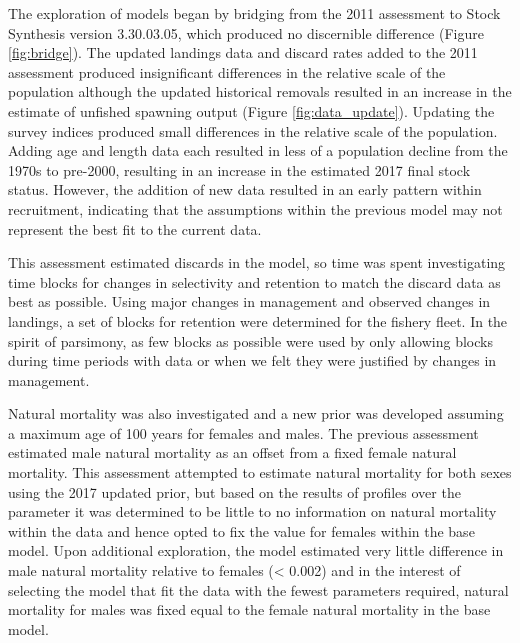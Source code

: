 \documentclass[12pt,]{article}
\begin{document}
The exploration of models began by bridging from the 2011 assessment to
Stock Synthesis version 3.30.03.05, which produced no discernible
difference (Figure \ref{fig:bridge}). The updated landings data and
discard rates added to the 2011 assessment produced insignificant
differences in the relative scale of the population although the updated
historical removals resulted in an increase in the estimate of unfished
spawning output (Figure \ref{fig:data_update}). Updating the survey
indices produced small differences in the relative scale of the
population. Adding age and length data each resulted in less of a
population decline from the 1970s to pre-2000, resulting in an increase
in the estimated 2017 final stock status. However, the addition of new
data resulted in an early pattern within recruitment, indicating that
the assumptions within the previous model may not represent the best fit
to the current data.

This assessment estimated discards in the model, so time was spent
investigating time blocks for changes in selectivity and retention to
match the discard data as best as possible. Using major changes in
management and observed changes in landings, a set of blocks for
retention were determined for the fishery fleet. In the spirit of
parsimony, as few blocks as possible were used by only allowing blocks
during time periods with data or when we felt they were justified by
changes in management.

Natural mortality was also investigated and a new prior was developed
assuming a maximum age of 100 years for females and males. The previous
assessment estimated male natural mortality as an offset from a fixed
female natural mortality. This assessment attempted to estimate natural
mortality for both sexes using the 2017 updated prior, but based on the
results of profiles over the parameter it was determined to be little to
no information on natural mortality within the data and hence opted to
fix the value for females within the base model. Upon additional
exploration, the model estimated very little difference in male natural
mortality relative to females (\textless{} 0.002) and in the interest of
selecting the model that fit the data with the fewest parameters
required, natural mortality for males was fixed equal to the female
natural mortality in the base model.
\end{document}
